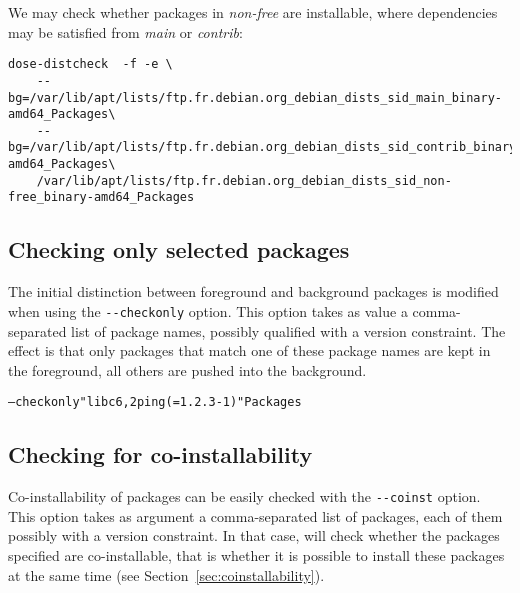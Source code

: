 \begin{example}
We may check whether packages in \textit{non-free} are installable,
where dependencies may be satisfied from \textit{main} or \textit{contrib}:
\begin{verbatim}
dose-distcheck  -f -e \
    --bg=/var/lib/apt/lists/ftp.fr.debian.org_debian_dists_sid_main_binary-amd64_Packages\
    --bg=/var/lib/apt/lists/ftp.fr.debian.org_debian_dists_sid_contrib_binary-amd64_Packages\
    /var/lib/apt/lists/ftp.fr.debian.org_debian_dists_sid_non-free_binary-amd64_Packages
\end{verbatim}
\end{example} 

\subsection{Checking only selected packages}
The initial distinction between foreground and background packages is
modified when using the \verb|--checkonly| option. This option takes
as value a comma-separated list of package names, possibly qualified
with a version constraint. The effect is that only packages that match
one of these package names are kept in the foreground, all others are
pushed into the background.

\begin{example}
\begin{alltt}
\debcheck{} --checkonly "libc6, 2ping (= 1.2.3-1)" Packages
\end{alltt}
\end{example}

\subsection{Checking for co-installability}
\label{sec:invocation-coinst}
Co-installability of packages can be easily checked with the
\verb|--coinst| option. This option takes as argument a
comma-separated list of packages, each of them possibly with a version
constraint. In that case, \debcheck{} will check whether the packages
specified are co-installable, that is whether it is possible to
install these packages at the same time (see
Section~\ref{sec:coinstallability}).

